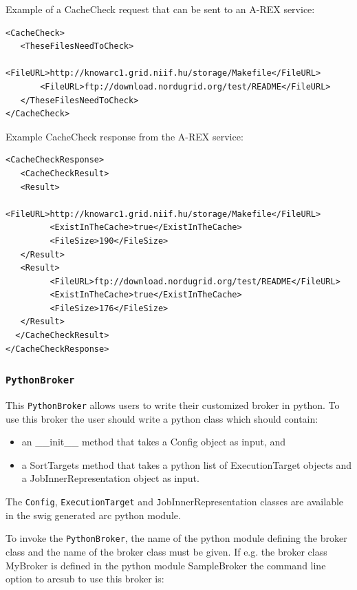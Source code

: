 \documentclass{book}
\newcommand{\Config}{\texttt{Config}}
\newcommand{\PythonBroker}{\texttt{PythonBroker}}
\newcommand{\ExecutionTarget}{\texttt{ExecutionTarget}}
\begin{document}
Example of a CacheCheck request that can be sent to an A-REX service:

\begin{shaded}
\begin{verbatim}
<CacheCheck>
   <TheseFilesNeedToCheck>
       <FileURL>http://knowarc1.grid.niif.hu/storage/Makefile</FileURL>
       <FileURL>ftp://download.nordugrid.org/test/README</FileURL>
   </TheseFilesNeedToCheck>
</CacheCheck>
\end{verbatim}
\end{shaded}

Example CacheCheck response from the A-REX service:

\begin{shaded}
\begin{verbatim}
<CacheCheckResponse>
   <CacheCheckResult>
   <Result>
         <FileURL>http://knowarc1.grid.niif.hu/storage/Makefile</FileURL>
         <ExistInTheCache>true</ExistInTheCache>
         <FileSize>190</FileSize>
   </Result>
   <Result>
         <FileURL>ftp://download.nordugrid.org/test/README</FileURL>
         <ExistInTheCache>true</ExistInTheCache>
         <FileSize>176</FileSize>
   </Result>
  </CacheCheckResult>
</CacheCheckResponse>
\end{verbatim}
\end{shaded}
   
\subsubsection{\PythonBroker}

This {\PythonBroker} allows users to write their customized broker in
python. To use this broker the user should write a python class which 
should contain:

\begin{itemize}

\item{an \_\_init\_\_ method that takes a Config object as input, and}
\item{a SortTargets method that takes a python list of ExecutionTarget
  objects and a JobInnerRepresentation object as input.}

\end{itemize}

The {\Config}, {\ExecutionTarget} and {\texttt JobInnerRepresentation} classes are
available in the swig generated arc python module.

To invoke the {\PythonBroker}, the name of the python module defining
the broker class and the name of the broker class must be given. If
e.g. the broker class MyBroker is defined in the python module
SampleBroker the command line option to arcsub to use this broker is:
\end{document}
